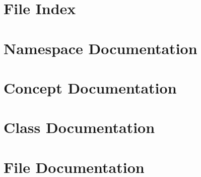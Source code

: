 \documentclass[twoside]{book}
\newcommand{\+}{\discretionary{\mbox{\scriptsize$\hookleftarrow$}}{}{}}
\newcommand{\clearemptydoublepage}{%
    \newpage{\pagestyle{empty}\cleardoublepage}%
  }
\begin{document}
\chapter{File Index}

\chapter{Namespace Documentation}


\chapter{Concept Documentation}


\chapter{Class Documentation}



















\chapter{File Documentation}



























  \backmatter

  \newpage
  \clearemptydoublepage



  \printindex

\end{document}
